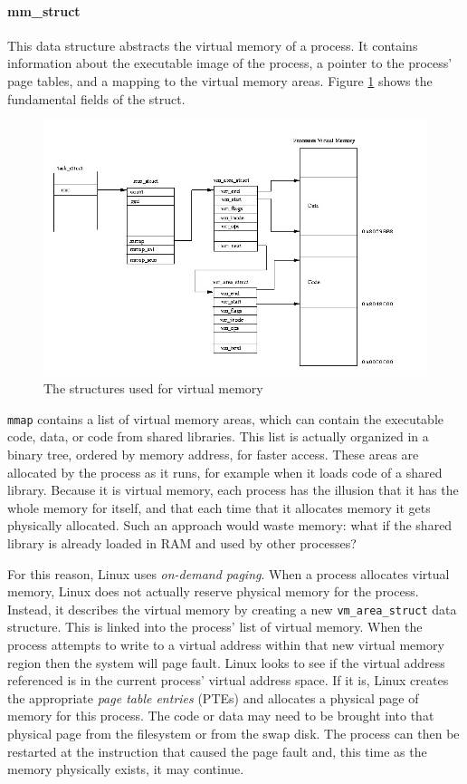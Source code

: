 \paragraph{mm\_struct} 
This data structure abstracts the virtual memory of a process. It contains information about the executable image of the process, a pointer to the process' page tables, and a mapping to the virtual memory areas. Figure \ref{img:mm} shows the fundamental fields of the struct.

\begin{figure}[ht]
\includegraphics[width=\textwidth]{images/mm.jpg}
\caption{The structures used for virtual memory}
\label{img:mm}
\end{figure}
\verb|mmap| contains a list of virtual memory areas, which can contain the executable code, data, or code from shared libraries.
This list is actually organized in a binary tree, ordered by memory address, for faster access. These areas are allocated by the process as it runs, for example when it loads code of a shared library. Because it is virtual memory, each process has the illusion that it has the whole memory for itself, and that each time that it allocates memory it gets physically allocated. Such an approach would waste memory: what if the shared library is already loaded in RAM and used by other processes?

For this reason, Linux uses \textit{on-demand paging}. When a process allocates virtual memory, Linux does not actually reserve physical memory for the process. Instead, it describes the virtual memory by creating a new \verb|vm_area_struct| data structure. This is linked into the process' list of virtual memory. When the process attempts to write to a virtual address within that new virtual memory region then the system will page fault. Linux looks to see if the virtual address referenced is in the current process' virtual address space. If it is, Linux creates the appropriate \textit{page table entries} (PTEs) and allocates a physical page of memory for this process. The code or data may need to be brought into that physical page from the filesystem or from the swap disk. The process can then be restarted at the instruction that caused the page fault and, this time as the memory physically exists, it may continue.\cite{tlk}

